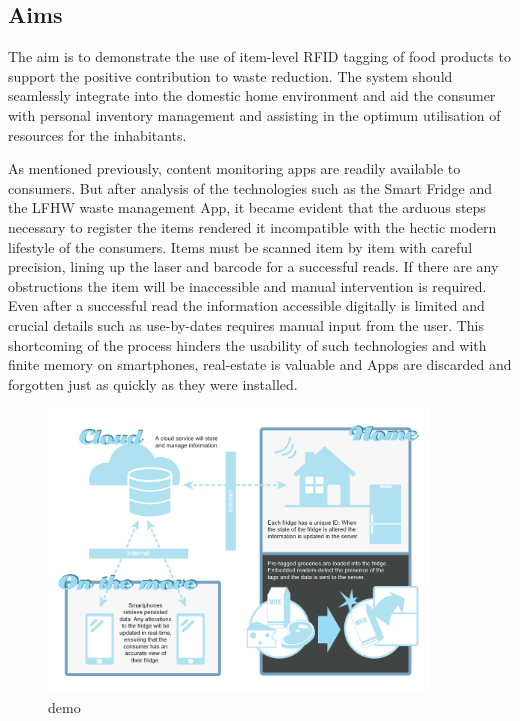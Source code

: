 \documentclass[a4paper, 11pt]{article}
\begin{document}
{\subsection{Aims}

The aim is to demonstrate the use of item-level RFID tagging of food products to support the positive contribution to waste reduction. The system should seamlessly integrate into the domestic home environment and aid the consumer with personal inventory management and assisting in the optimum utilisation of resources for the inhabitants. 

As mentioned previously, content monitoring apps are readily available to consumers. But after analysis of the technologies such as the Smart Fridge and the LFHW waste management App, it became evident that the arduous steps necessary to register the items rendered it incompatible with the hectic modern lifestyle of the consumers. Items must be scanned item by item with careful precision, lining up the laser and barcode for a successful reads. If there are any obstructions the item will be inaccessible and manual intervention is required. Even after a successful read the information accessible digitally is limited and crucial details such as use-by-dates requires manual input from the user. This shortcoming of the process hinders the usability of such technologies and with finite memory on smartphones, real-estate is valuable and Apps are discarded and forgotten just as quickly as they were installed.

\begin{figure}[h!]
  \centering
    \includegraphics[width=0.9\textwidth]{system2.png}
      \caption{demo}
\end{figure}

}
\end{document}
